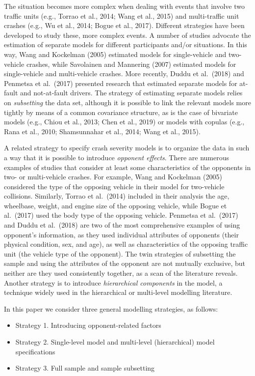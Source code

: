 \documentclass[]{elsarticle} %
\providecommand{\tightlist}{%
  \setlength{\itemsep}{0pt}\setlength{\parskip}{0pt}}
\begin{document}
The situation becomes more complex when dealing with events that involve
two traffic units (e.g., Torrao et al., 2014; Wang et al., 2015) and
multi-traffic unit crashes (e.g., Wu et al., 2014; Bogue et al., 2017).
Different strategies have been developed to study these, more complex
events. A number of studies advocate the estimation of separate models
for different participants and/or situations. In this way, Wang and
Kockelman (2005) estimated models for single-vehicle and two-vehicle
crashes, while Savolainen and Mannering (2007) estimated models for
single-vehicle and multi-vehicle crashes. More recently, Duddu et
al.~(2018) and Penmetsa et al.~(2017) presented research that estimated
separate models for at-fault and not-at-fault drivers. The strategy of
estimating separate models relies on \emph{subsetting} the data set,
although it is possible to link the relevant models more tightly by
means of a common covariance structure, as is the case of bivariate
models (e.g., Chiou et al., 2013; Chen et al., 2019) or models with
copulas (e.g., Rana et al., 2010; Shamsunnahar et al., 2014; Wang et
al., 2015).

A related strategy to specify crash severity models is to organize the
data in such a way that it is possible to introduce \emph{opponent
effects}. There are numerous examples of studies that consider at least
some characteristics of the opponents in two- or multi-vehicle crashes.
For example, Wang and Kockelman (2005) considered the type of the
opposing vehicle in their model for two-vehicle collisions. Similarly,
Torrao et al.~(2014) included in their analysis the age, wheelbase,
weight, and engine size of the opposing vehicle, while Bogue et
al.~(2017) used the body type of the opposing vehicle. Penmetsa et
al.~(2017) and Duddu et al.~(2018) are two of the most comprehensive
examples of using opponent's information, as they used individual
attributes of opponents (their physical condition, sex, and age), as
well as characteristics of the opposing traffic unit (the vehicle type
of the opponent). The twin strategies of subsetting the sample and using
the attributes of the opponent are not mutually exclusive, but neither
are they used consistently together, as a scan of the literature
reveals. Another strategy is to introduce \emph{hierarchical components}
in the model, a technique widely used in the hierarchical or multi-level
modelling literature.

In this paper we consider three general modelling strategies, as
follows:

\begin{itemize}
\tightlist
\item
  Strategy 1. Introducing opponent-related factors
\item
  Strategy 2. Single-level model and multi-level (hierarchical) model
  specifications
\item
  Strategy 3. Full sample and sample subsetting
\end{itemize}
\end{document}
